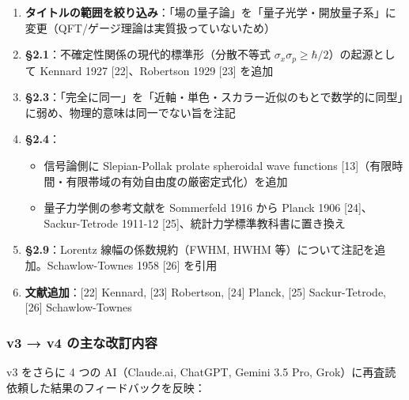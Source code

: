 \documentclass[
]{ltjsarticle}
\providecommand{\tightlist}{%
  \setlength{\itemsep}{0pt}\setlength{\parskip}{0pt}}
\begin{document}
\begin{enumerate}
\def\labelenumi{\arabic{enumi}.}
\tightlist
\item
  \textbf{タイトルの範囲を絞り込み}：「場の量子論」を「量子光学・開放量子系」に変更（QFT/ゲージ理論は実質扱っていないため）
\item
  \textbf{§2.1}：不確定性関係の現代的標準形（分散不等式
  \(\sigma_x \sigma_p \geq \hbar/2\)）の起源として Kennard 1927
  {[}22{]}、Robertson 1929 {[}23{]} を追加
\item
  \textbf{§2.3}：「完全に同一」を「近軸・単色・スカラー近似のもとで数学的に同型」に弱め、物理的意味は同一でない旨を注記
\item
  \textbf{§2.4}：

  \begin{itemize}
  \tightlist
  \item
    信号論側に Slepian-Pollak prolate spheroidal wave functions
    {[}13{]}（有限時間・有限帯域の有効自由度の厳密定式化）を追加
  \item
    量子力学側の参考文献を Sommerfeld 1916 から Planck 1906
    {[}24{]}、Sackur-Tetrode 1911-12
    {[}25{]}、統計力学標準教科書に置き換え
  \end{itemize}
\item
  \textbf{§2.9}：Lorentz 線幅の係数規約（FWHM, HWHM
  等）について注記を追加。Schawlow-Townes 1958 {[}26{]} を引用
\item
  \textbf{文献追加}：{[}22{]} Kennard, {[}23{]} Robertson, {[}24{]}
  Planck, {[}25{]} Sackur-Tetrode, {[}26{]} Schawlow-Townes
\end{enumerate}

\subsubsection{v3 → v4
の主な改訂内容}\label{v3-v4-ux306eux4e3bux306aux6539ux8a02ux5185ux5bb9}

v3 をさらに 4 つの AI（Claude.ai, ChatGPT, Gemini 3.5 Pro,
Grok）に再査読依頼した結果のフィードバックを反映：
\end{document}
